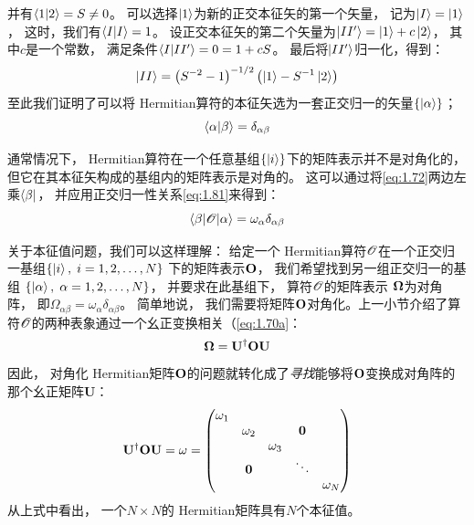 \begin{enumerate}[]
 并有$\langle 1 \vert 2 \rangle = S \neq 0$。
 可以选择$\Ket{1}$为新的正交本征矢的第一个矢量，
 记为$\Ket{I} = \Ket{1}$，
 这时，我们有$\langle I \vert I \rangle = 1$。
 设正交本征矢的第二个矢量为$\Ket{II^\prime} = \Ket{1} + c\Ket{2}$，
 其中$c$是一个常数，
 满足条件$\langle I \vert II^\prime \rangle = 0 = 1+cS$。
 最后将$\Ket{II^\prime}$归一化，得到：
 \begin{equation}
     \Ket{II} = \left(S^{-2}-1\right)^{-1/2}\left(\Ket{1}-S^{-1}\Ket{2}\right)
     \label{eq:1.80}
 \end{equation}
 至此我们证明了可以将 Hermitian算符的本征矢选为一套正交归一的矢量$\left\{ \Ket{\alpha} \right\}$；
 \begin{equation}
     \langle \alpha \vert \beta \rangle = \delta_{\alpha\beta}
     \label{eq:1.81}
 \end{equation}
\end{enumerate}

通常情况下，
Hermitian算符在一个任意基组$\left\{ \Ket{i} \right\}$下的矩阵表示并不是对角化的，
但它在其本征矢构成的基组内的矩阵表示是对角的。
这可以通过将\autoref{eq:1.72}两边左乘$\Bra{\beta}$，
并应用正交归一性关系\autoref{eq:1.81}来得到：
\begin{equation}
 \left\langle \beta\middle\vert \mathscr{O} \middle\vert \alpha\right\rangle = \omega_\alpha\delta_{\alpha\beta}
 \label{eq:1.82}
\end{equation}

关于本征值问题，我们可以这样理解：
给定一个 Hermitian算符$\mathscr{O}$在一个正交归一基组$\left\{\Ket{i},\; i = 1, 2, \dots, N\right\}$ 下的矩阵表示$\mathbf O$，
我们希望找到另一组正交归一的基组 $\left\{\Ket{\alpha},\; \alpha = 1, 2, \dots, N\right\}$，
并要求在此基组下，
算符$\mathscr{O}$的矩阵表示 $\mathbf\Omega$为对角阵，
即$\Omega_{\alpha\beta} = \omega_\alpha\delta_{\alpha\beta}$。
简单地说，
我们需要将矩阵$\mathbf O$对角化。上一小节介绍了算符$\mathscr{O}$的两种表象通过一个幺正变换相关（\autoref{eq:1.70a}：
\[\mathbf\Omega = \mathbf U^\dagger\mathbf{O}\mathbf{U}\]
因此，
对角化 Hermitian矩阵$\mathbf O$的问题就转化成了\emph{寻找}能够将$\mathbf O$变换成对角阵的那个幺正矩阵$\mathbf{U}$：
\begin{equation}
 \mathbf U^\dagger\mathbf{O}\mathbf{U} = \mathbf\omega = \begin{pmatrix}
     \omega_1     & & & &\\
          &\omega_2 &     &\mathbf{0} &\\
          & &\omega_3 & &\\
          &\mathbf{0} & & \ddots & \\
          & &     & &\omega_N
 \end{pmatrix}
 \label{eq:1.83}
\end{equation}
从上式中看出，
一个$N\times N$的 Hermitian矩阵具有$N$个本征值。

